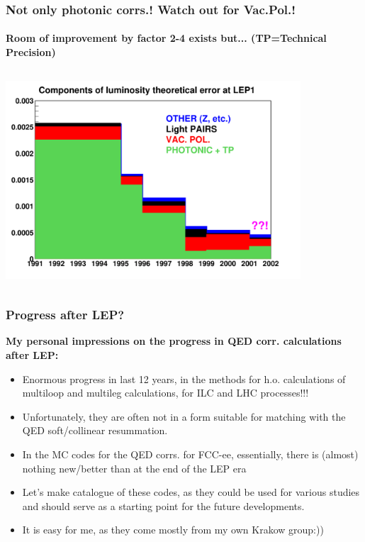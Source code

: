 \documentclass{beamer}
\newcommand{\yel}{\color{yellow}}
\begin{document}
\begin{frame}[fragile]
\frametitle{\bf Not only photonic corrs.! Watch out for Vac.Pol.!}
\framesubtitle{\bf Room of improvement by {\yel factor 2-4} exists but... 
 (TP=Technical Precision)}

\vspace{-2mm}
{\includegraphics[width=110mm,height=80mm]{cFigB.pdf}}

\end{frame}

\begin{frame}[fragile]
\frametitle{\bf Progress after LEP?}

\bf
My personal impressions on the progress in QED corr. calculations after LEP:
\begin{itemize}
\item
Enormous progress in last 12 years, in the methods
for h.o. calculations of multiloop and multileg calculations,
for ILC and LHC processes!!!
\item
Unfortunately, they are often not in a form suitable for matching
with the QED soft/collinear resummation.
\item
In the MC codes for the QED corrs. for FCC-ee, essentially,
there is (almost) nothing new/better than at the end of the LEP era
\item
Let's make catalogue of these codes, as
they could be used for various studies 
and should serve as a starting point for the future developments.
\item
It is easy for me, as they come mostly from my own Krakow group:))
\end{itemize}

\end{frame}
\end{document}
